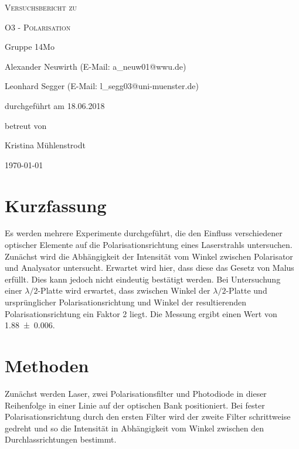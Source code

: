 \documentclass[
	a4paper,
	12pt,
	pagesize,
	ngerman
]{scrartcl}
\begin{document}
	
	\begin{titlepage}
		\centering
		{\scshape\LARGE Versuchsbericht zu \par}
		\vspace{1cm}
		{\scshape\huge O3 - Polarisation \par}
		\vspace{2.5cm}
		{\LARGE Gruppe 14Mo \par}
		\vspace{0.5cm}
		
		{\large Alexander Neuwirth (E-Mail: a\_neuw01@wwu.de) \par}
		{\large Leonhard Segger (E-Mail: l\_segg03@uni-muenster.de) \par}
		\vfill
		
		durchgeführt am 18.06.2018\par
		betreut von\par
		{\large Kristina Mühlenstrodt}
		
		\vfill
		
		{\large \today\par}
	\end{titlepage}
	\tableofcontents
	\newpage


	\section{Kurzfassung}
	Es werden mehrere Experimente durchgeführt, die den Einfluss verschiedener optischer Elemente auf die Polarisationsrichtung eines Laserstrahls untersuchen.
	Zunächst wird die Abhängigkeit der Intensität vom Winkel zwischen Polarisator und Analysator untersucht.
	Erwartet wird hier, dass diese das Gesetz von Malus erfüllt.
	Dies kann jedoch nicht eindeutig bestätigt werden. %
	Bei Untersuchung einer $\lambda /2$-Platte wird erwartet, dass zwischen Winkel der  $\lambda /2$-Platte und ursprünglicher Polarisationsrichtung und Winkel der resultierenden Polarisationsrichtung ein Faktor 2 liegt.
	Die Messung ergibt einen Wert von \SI{1,88\pm 0,006}{}.
	
	\section{Methoden}
	Zunächst werden Laser, zwei Polarisationsfilter und Photodiode in dieser Reihenfolge in einer Linie auf der optischen Bank positioniert.
	Bei fester Polarisationsrichtung durch den ersten Filter wird der zweite Filter schrittweise gedreht und so die Intensität in Abhängigkeit vom Winkel zwischen den Durchlassrichtungen bestimmt.
	
\end{document}
